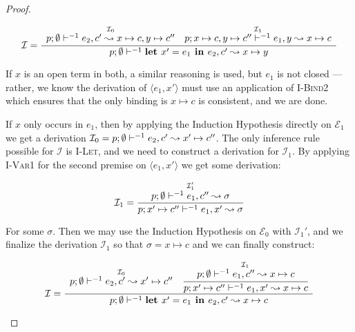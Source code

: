 \begin{proof}
\begin{itemize}
\begin{itemize}
         \begin{align*}
           \mathcal{I} = \dfrac
           {\begin{array}{cc}
               \overset
                 {\mathcal{I}_0}
                 {p;\emptyset\vdash^{-1} e_2, c' \leadsto x \mapsto c, y \mapsto c''} &
               \overset
                 {\mathcal{I}_1}
                 {p; x \mapsto c, y \mapsto c'' \vdash^{-1} e_1, y \leadsto x \mapsto c}
            \end{array}
           }
           {p;\emptyset\vdash^{-1} \textbf{let } x' = e_1 \textbf{ in } e_2, c' \leadsto x \mapsto y}
         \end{align*}

         If $x$ is an open term in both, a similar reasoning is used, but $e_1$
         is not closed --- rather, we know the derivation of $\langle e_1, x'
         \rangle$ must use an application of \textsc{I-Bind2} which ensures
         that the only binding is $x \mapsto c$ is consistent, and we are done.

         If $x$ only occurs in $e_1$, then by applying the Induction Hypothesis
         directly on $\mathcal{E}_1$ we get a derivation $\mathcal{I}_0 =
         p;\emptyset\vdash^{-1} e_2, c' \leadsto x' \mapsto c''$. The only inference rule
         possible for $\mathcal{I}$ is \textsc{I-Let}, and we need to construct
         a derivation for $\mathcal{I}_1$. By applying \textsc{I-Var1} for the
         second premise on $\langle e_1, x' \rangle$ we get some derivation:

         \begin{align*}
           \mathcal{I}_1 = \dfrac
            {\overset
              {\mathcal{I}_1'}
              {p;\emptyset\vdash^{-1} e_1, c'' \leadsto \sigma}
            }
            {p; x' \mapsto c'' \vdash^{-1} e_1, x' \leadsto \sigma}
         \end{align*}

         For some $\sigma$. Then we may use the Induction Hypothesis on
         $\mathcal{E}_0$ with $\mathcal{I}_1'$, and we finalize the derivation
         $\mathcal{I}_1$ so that $\sigma = x \mapsto c$ and we can finally
         construct:

         \begin{align*}
           \mathcal{I} = \dfrac
            {\begin{array}{cc}
                \overset
                  {\mathcal{I}_0}
                  {p;\emptyset\vdash^{-1} e_2, c' \leadsto x' \mapsto c''} &
                \overset
                  {\mathcal{I}_1}
                  {\cfrac
                    {p;\emptyset\vdash^{-1} e_1, c'' \leadsto x \mapsto c}
                    {p; x' \mapsto c'' \vdash^{-1} e_1, x' \leadsto x \mapsto c}
                  }
             \end{array}}
            {p;\emptyset\vdash^{-1} \textbf{let } x' = e_1 \textbf{ in } e_2, c' \leadsto x \mapsto c}
         \end{align*}


\end{itemize}
\end{itemize}
\end{proof}
